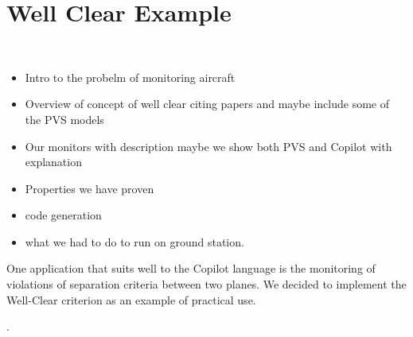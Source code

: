 \section{Well Clear Example}~\label{sec:WellClear}


\begin{itemize}
\item Intro to the probelm of monitoring aircraft
\item Overview of concept of well clear citing papers and maybe include some of the PVS models
\item Our monitors with description maybe we show both PVS and Copilot with explanation
\item Properties we have proven
\item code generation 
\item what we had to do to run on ground station. 
\end{itemize}

One application that suits well to the Copilot language is the monitoring of violations of separation criteria between two planes. We decided to implement the Well-Clear criterion as an example of practical use.

.

